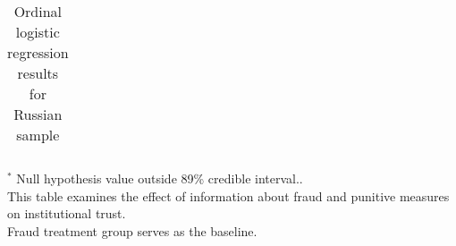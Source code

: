 \begin{table}[h]
\begin{center}
\begin{threeparttable}
\begin{tabular}{l c c c c c c}
\hline
\end{tabular}
\begin{tablenotes}[flushleft]
\scriptsize{$^*$ Null hypothesis value outside 89\% credible interval..  \\
This table examines the effect of information about fraud
                      and punitive measures on institutional trust. \\
Fraud treatment group serves as the baseline.}
\end{tablenotes}
\end{threeparttable}
\caption{Ordinal logistic regression results for Russian sample}
\label{table:coefficients}
\end{center}
\end{table}
